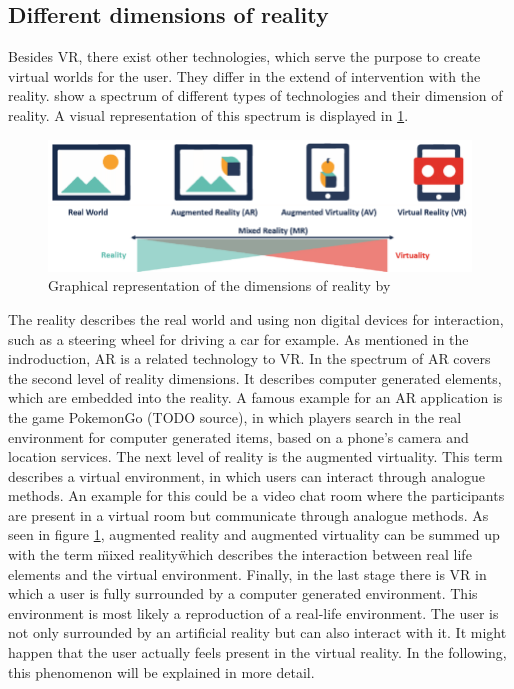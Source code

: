 \subsection{Different dimensions of reality}
Besides VR, there exist other technologies, which serve the purpose to create virtual worlds for the user. They differ in the extend of intervention with the reality. \cite{Tham.2018} show a spectrum of different types of technologies and their dimension of reality. A visual representation of this spectrum is displayed in \ref{fig:spectrum}.\\
\begin{figure}[h!]
  \includegraphics[width=14cm]{kapitel/spectrum-of-reality.png}
  \centering
  \caption{Graphical representation of the dimensions of reality by 	  \cite{Lovreglio.2018}}
  \label{fig:spectrum}
\end{figure}

The reality describes the real world and using non digital devices for interaction, such as a steering wheel for driving a car for example. As mentioned in the indroduction, AR is a related technology to VR. In the spectrum of \cite{Tham.2018} AR covers the second level of reality dimensions. It describes computer generated elements, which are embedded into the reality. A famous example for an AR application is the game PokemonGo (TODO source), in which players search in the real environment for computer generated items, based on a phone's camera and location services. The next level of reality is the augmented virtuality. This term describes a virtual environment, in which users can interact through analogue methods. An example for this could be a video chat room where the participants are present in a virtual room but communicate through analogue methods. As seen in figure \ref{fig:spectrum}, augmented reality and augmented virtuality can be summed up with the term \"mixed reality\" which describes the interaction between real life elements and the virtual environment. Finally, in the last stage there is VR in which a user is fully surrounded by a computer generated environment. This environment is most likely a reproduction of a real-life environment. The user is not only surrounded by an artificial reality but can also interact with it. It might happen that the user actually feels present in the virtual reality. In the following, this phenomenon will be explained in more detail.

